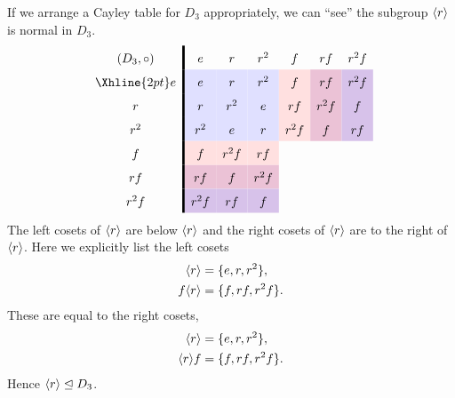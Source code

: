 \documentclass{ximera}
\begin{document}
\begin{example}
  If we arrange a Cayley table for $D_3$ appropriately, we can ``see''
  the subgroup $\langle r\rangle$ is normal in $D_3$.
    \[
    \renewcommand{\arraystretch}{1.6}
    \begin{array}{c!{\vline width 2pt}cccccc}
      (D_3,\circ)& e                              & r                              & r^2                            & f                             & r f                                   & r^2 f  \\  \Xhline{2pt}
      e          & e\cellcolor{blue!12!white}     & r\cellcolor{blue!12!white}    & r^2\cellcolor{blue!12!white}   & f \cellcolor{red!12!white}    & r f \cellcolor{blue!33!red!24!white}   & r^2f \cellcolor{blue!66!red!24!white} \\  
      r                                  & r\cellcolor{blue!12!white}    & r^2\cellcolor{blue!12!white}   & e \cellcolor{blue!12!white}    & rf\cellcolor{red!12!white} & r^2f \cellcolor{blue!33!red!24!white}    & f \cellcolor{blue!66!red!24!white}   \\  
      r^2                                 & r^2\cellcolor{blue!12!white}   & e\cellcolor{blue!12!white}     & r\cellcolor{blue!12!white}    & r^2 f \cellcolor{red!12!white}   & f \cellcolor{blue!33!red!24!white} & rf \cellcolor{blue!66!red!24!white}   \\  
      f        & f \cellcolor{red!12!white}    & r^2f \cellcolor{red!12!white}   & r f \cellcolor{red!12!white} &     &   &   \\  
      r f       & rf \cellcolor{blue!33!red!24!white}   & f \cellcolor{blue!33!red!24!white} & r^2f \cellcolor{blue!33!red!24!white}   &    &      &     \\  
      r^2 f       & r^2 f\cellcolor{blue!66!red!24!white} & rf \cellcolor{blue!66!red!24!white}    & f \cellcolor{blue!66!red!24!white}  &     &     &      \\  
    \end{array}
    \]
    The left cosets of $\langle r\rangle$ are below $\langle r\rangle$ and the right cosets
    of $\langle r\rangle$ are to the right of $\langle r\rangle$. Here we explicitly list the left cosets
    \begin{align*}
      \langle r\rangle &= \{e, r, r^2\},\\
      f\langle r\rangle &= \{f, rf, r^2f\}.
    \end{align*}
    These are equal to the right cosets,
     \begin{align*}
      \langle r\rangle &= \{e, r, r^2\},\\
      \langle r\rangle f &= \{f, rf, r^2f\}.
    \end{align*}
    Hence $\langle r\rangle\trianglelefteq D_3$.
\end{example}
\end{document}

